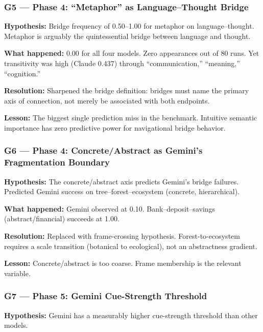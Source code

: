 \subsubsection{G5 --- Phase 4: ``Metaphor'' as Language--Thought Bridge}\label{g5-phase-4-metaphor-as-languagethought-bridge}

\textbf{Hypothesis:} Bridge frequency of 0.50--1.00 for metaphor on language--thought. Metaphor is arguably the quintessential bridge between language and thought.

\textbf{What happened:} 0.00 for all four models. Zero appearances out of 80 runs. Yet transitivity was high (Claude 0.437) through ``communication,'' ``meaning,'' ``cognition.''

\textbf{Resolution:} Sharpened the bridge definition: bridges must name the primary axis of connection, not merely be associated with both endpoints.

\textbf{Lesson:} The biggest single prediction miss in the benchmark. Intuitive semantic importance has zero predictive power for navigational bridge behavior.

\subsubsection{G6 --- Phase 4: Concrete/Abstract as Gemini's Fragmentation Boundary}\label{g6-phase-4-concreteabstract-as-geminis-fragmentation-boundary}

\textbf{Hypothesis:} The concrete/abstract axis predicts Gemini's bridge failures. Predicted Gemini success on tree--forest--ecosystem (concrete, hierarchical).

\textbf{What happened:} Gemini observed at 0.10. Bank--deposit--savings (abstract/financial) succeeds at 1.00.

\textbf{Resolution:} Replaced with frame-crossing hypothesis. Forest-to-ecosystem requires a scale transition (botanical to ecological), not an abstractness gradient.

\textbf{Lesson:} Concrete/abstract is too coarse. Frame membership is the relevant variable.

\subsubsection{G7 --- Phase 5: Gemini Cue-Strength Threshold}\label{g7-phase-5-gemini-cue-strength-threshold}

\textbf{Hypothesis:} Gemini has a measurably higher cue-strength threshold than other models.

